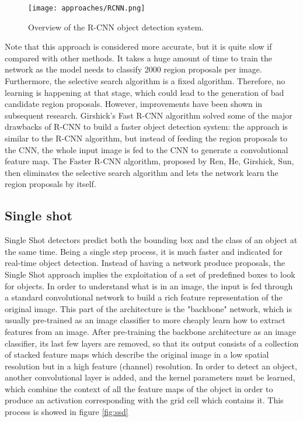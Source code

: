 \begin{figure}[h]
	\caption{Overview of the R-CNN object detection system.}
	\centering
	\texttt{[image: approaches/RCNN.png]}
	\label{fig:rcnn}
\end{figure}

Note that this approach is considered more accurate, but it is quite slow if compared with other methods. It takes a huge amount of time to train the network as the model needs to classify 2000 region proposals per image. Furthermore, the selective search algorithm is a fixed algorithm. Therefore, no learning is happening at that stage, which could lead to the generation of bad candidate region proposals. However, improvements have been shown in subsequent research. Girshick’s Fast R-CNN algorithm solved some of the major drawbacks of R-CNN to build a faster object detection system: the approach is similar to the R-CNN algorithm, but instead of feeding the region proposals to the CNN, the whole input image is fed to the CNN to generate a convolutional feature map. The Faster R-CNN algorithm, proposed by Ren, He, Girshick, Sun, then eliminates the selective search algorithm and lets the network learn the region proposals by itself.

\subsection{Single shot}
\label{ssec:singleshot}

Single Shot detectors predict both the bounding box and the class of an object at the same time. Being a single step process, it is much faster and indicated for real-time object detection. Instead of having a network produce proposals, the Single Shot approach implies the exploitation of a set of predefined boxes to look for objects. In order to understand what is in an image, the input is fed through a standard convolutional network to build a rich feature representation of the original image. This part of the architecture is the "backbone" network, which is usually pre-trained as an image classifier to more cheaply learn how to extract features from an image. After pre-training the backbone architecture as an image classifier, its last few layers are removed, so that its output consists of a collection of stacked feature maps which describe the original image in a low spatial resolution but in a high feature (channel) resolution. In order to detect an object, another convolutional layer is added, and the kernel parameters must be learned, which combine the context of all the feature maps of the object in order to produce an activation corresponding with the grid cell which contains it. This process is showed in figure \ref{fig:ssd} 

